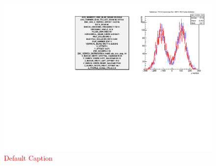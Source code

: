 \begin{figure}
\begin{center}
\includegraphics[width=\linewidth,height=\textheight,keepaspectratio]{./figures/359711_step14_config_compare}
\caption{ 
\textcolor{red}{Default Caption}
}
\label{fig:359711_step14_config_compare}
\end{center}
\end{figure}

